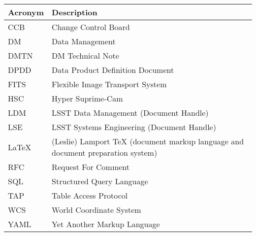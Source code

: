 \addtocounter{table}{-1}
\begin{longtable}{p{}p{}}\hline
\textbf{Acronym} & \textbf{Description}  \\\hline

CCB & Change Control Board \\\hline
DM & Data Management \\\hline
DMTN & DM Technical Note \\\hline
DPDD & Data Product Definition Document \\\hline
FITS & Flexible Image Transport System \\\hline
HSC & Hyper Suprime-Cam \\\hline
LDM & LSST Data Management (Document Handle) \\\hline
LSE & LSST Systems Engineering (Document Handle) \\\hline
LaTeX & (Leslie) Lamport TeX (document markup language and document preparation system) \\\hline
RFC & Request For Comment \\\hline
SQL & Structured Query Language \\\hline
TAP & Table Access Protocol \\\hline
WCS & World Coordinate System \\\hline
YAML & Yet Another Markup Language \\\hline
\end{longtable}
